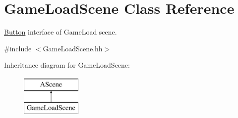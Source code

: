 \hypertarget{classGameLoadScene}{}\section{Game\+Load\+Scene Class Reference}
\label{classGameLoadScene}


\hyperlink{classButton}{Button} interface of Game\+Load scene.  




{\ttfamily \#include $<$Game\+Load\+Scene.\+hh$>$}

Inheritance diagram for Game\+Load\+Scene\+:\begin{figure}[H]
\begin{center}
\leavevmode
\includegraphics[height=2.000000cm]{classGameLoadScene}
\end{center}
\end{figure}
